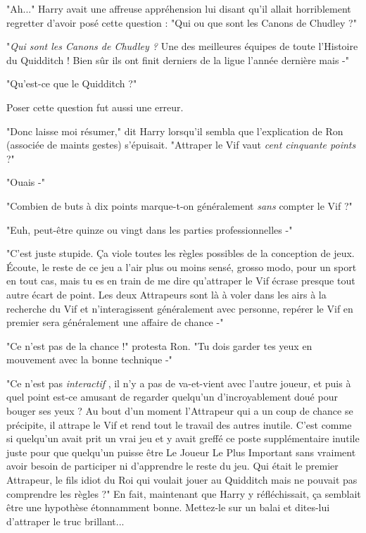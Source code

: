 "Ah..." Harry avait une affreuse appréhension lui disant qu'il allait horriblement regretter d'avoir posé cette question : "Qui ou que sont les Canons de Chudley ?"

"\emph{Qui sont les Canons de Chudley ?}  Une des meilleures équipes de toute l'Histoire du Quidditch ! Bien sûr ils ont finit derniers de la ligue l'année dernière mais -"

"Qu'est-ce que le Quidditch ?"

Poser cette question fut aussi une erreur.

"Donc laisse moi résumer," dit Harry lorsqu'il sembla que l'explication de Ron (associée de maints gestes) s'épuisait. "Attraper le Vif vaut \emph{cent cinquante points}  ?"

"Ouais -"

"Combien de buts à dix points marque-t-on généralement \emph{sans}  compter le Vif ?"

"Euh, peut-être quinze ou vingt dans les parties professionnelles -"

"C'est juste stupide. Ça viole toutes les règles possibles de la conception de jeux. Écoute, le reste de ce jeu a l'air plus ou moins sensé, grosso modo, pour un sport en tout cas, mais tu es en train de me dire qu'attraper le Vif écrase presque tout autre écart de point. Les deux Attrapeurs sont là à voler dans les airs à la recherche du Vif et n'interagissent généralement avec personne, repérer le Vif en premier sera généralement une affaire de chance -"

"Ce n'est pas de la chance !" protesta Ron. "Tu dois garder tes yeux en mouvement avec la bonne technique -"

"Ce n'est pas \emph{interactif} , il n'y a pas de va-et-vient avec l'autre joueur, et puis à quel point est-ce amusant de regarder quelqu'un d'incroyablement doué pour bouger ses yeux ? Au bout d'un moment l'Attrapeur qui a un coup de chance se précipite, il attrape le Vif et rend tout le travail des autres inutile. C'est comme si quelqu'un avait prit un vrai jeu et y avait greffé ce poste supplémentaire inutile juste pour que quelqu'un puisse être Le Joueur Le Plus Important sans vraiment avoir besoin de participer ni d'apprendre le reste du jeu. Qui était le premier Attrapeur, le fils idiot du Roi qui voulait jouer au Quidditch mais ne pouvait pas comprendre les règles ?" En fait, maintenant que Harry y réfléchissait, ça semblait être une hypothèse étonnamment bonne. Mettez-le sur un balai et dites-lui d'attraper le truc brillant...

